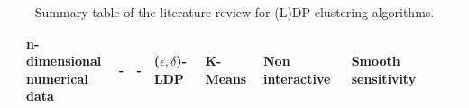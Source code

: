 \begin{landscape}
\begin{table}[ht]
\begin{tabular}{rlllllllll}
            \citep{nissim_smooth_2007}                 & \makecell[l]{n-dimensional                                                                                                                          \\ numerical data}             & -                                                  & -                                                  & ($\epsilon, \delta$)-LDP & K-Means             & Non interactive & Smooth sensitivity               \\
            \bottomrule
        \end{tabular}
        \caption{Summary table of the literature review for (L)DP clustering algorithms.}
        \label{tab:summary_table_kmeans}
    \end{table}


    \begin{table}[ht]
        \centering


\end{table}
\end{landscape}
